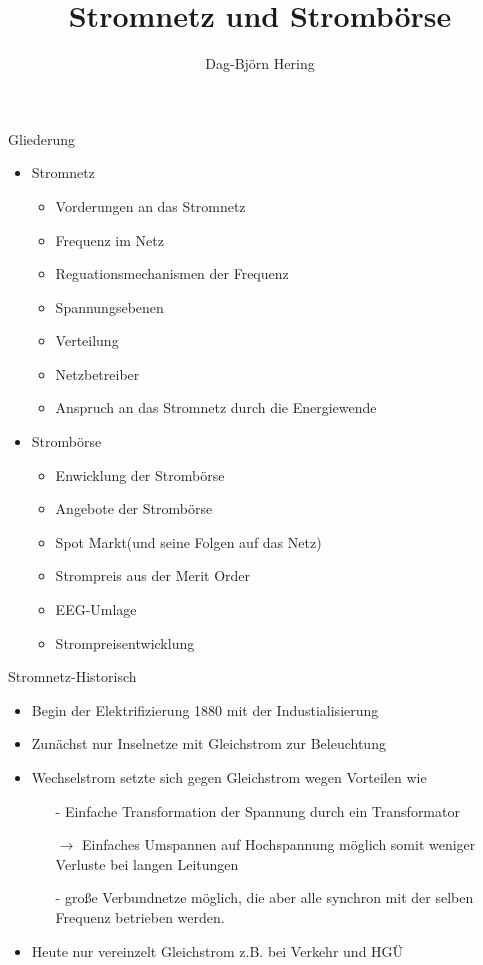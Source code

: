 \documentclass[aspectratio=1610, professionalfonts, 9pt]{beamer}
\title{Stromnetz und Strombörse}
\author[D.~Hering]{Dag-Björn Hering}
\begin{document}
\maketitle
\begin{frame}
\end{frame}

\begin{frame}{Gliederung}
\begin{itemize}
  \item Stromnetz
  \begin{itemize}
  \item Vorderungen an das Stromnetz
  \item Frequenz im Netz
  \item Reguationsmechanismen der Frequenz
  \item Spannungsebenen
  \item Verteilung
  \item Netzbetreiber
  \item Anspruch an das Stromnetz durch die Energiewende
  \end{itemize}
\end{itemize}
\end{frame}
\begin{frame}
\begin{itemize}
 \item Strombörse
\begin{itemize}
  \item Enwicklung der Strombörse
  \item Angebote der Strombörse
  \item Spot Markt(und seine Folgen auf das Netz)
  \item Strompreis aus der Merit Order
  \item EEG-Umlage
  \item Strompreisentwicklung
\end{itemize}
\end{itemize}
\end{frame}


\begin{frame}{Stromnetz-Historisch}
\begin{itemize}
  \item Begin der Elektrifizierung 1880 mit der Industialisierung
  \item Zunächst nur Inselnetze mit Gleichstrom zur Beleuchtung
  \item Wechselstrom setzte sich gegen Gleichstrom wegen Vorteilen wie
  \begin{itemize}
    \item[-] Einfache Transformation der Spannung durch ein Transformator
    \item[$\rightarrow$] Einfaches Umspannen auf Hochspannung möglich
    somit weniger Verluste bei langen Leitungen
    \item[-] große Verbundnetze möglich, die aber alle synchron mit der selben Frequenz betrieben werden.
  \end{itemize}
  \item Heute nur vereinzelt Gleichstrom z.B. bei Verkehr und HGÜ
\end{itemize}
\end{frame}
\end{document}

